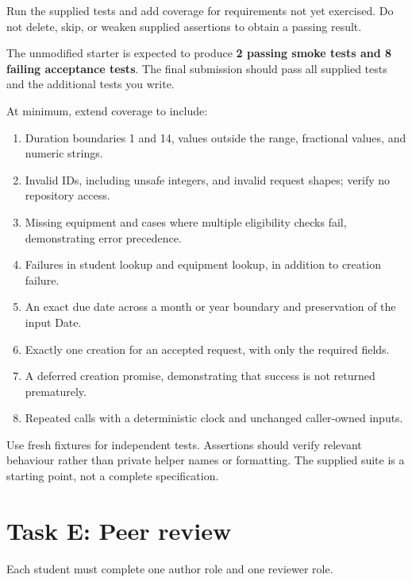 \documentclass[
  11pt,
]{article}
\providecommand{\tightlist}{%
  \setlength{\itemsep}{0pt}\setlength{\parskip}{0pt}}
\begin{document}
Run the supplied tests and add coverage for requirements not yet
exercised. Do not delete, skip, or weaken supplied assertions to obtain
a passing result.

The unmodified starter is expected to produce \textbf{2 passing smoke
tests and 8 failing acceptance tests}. The final submission should pass
all supplied tests and the additional tests you write.

At minimum, extend coverage to include:

\begin{enumerate}
\def\labelenumi{\arabic{enumi}.}
\tightlist
\item
  Duration boundaries 1 and 14, values outside the range, fractional
  values, and numeric strings.
\item
  Invalid IDs, including unsafe integers, and invalid request shapes;
  verify no repository access.
\item
  Missing equipment and cases where multiple eligibility checks fail,
  demonstrating error precedence.
\item
  Failures in student lookup and equipment lookup, in addition to
  creation failure.
\item
  An exact due date across a month or year boundary and preservation of
  the input Date.
\item
  Exactly one creation for an accepted request, with only the required
  fields.
\item
  A deferred creation promise, demonstrating that success is not
  returned prematurely.
\item
  Repeated calls with a deterministic clock and unchanged caller-owned
  inputs.
\end{enumerate}

Use fresh fixtures for independent tests. Assertions should verify
relevant behaviour rather than private helper names or formatting. The
supplied suite is a starting point, not a complete specification.

\hypertarget{task-e-peer-review}{%
\section{Task E: Peer review}\label{task-e-peer-review}}

Each student must complete one author role and one reviewer role.
\end{document}
